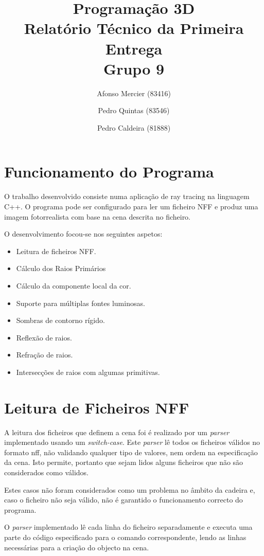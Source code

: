 \documentclass{article}
\title{
    \textbf{Programação 3D} \\
    Relatório Técnico da Primeira Entrega \\
    Grupo 9
}
\author{Afonso Mercier (83416) \and Pedro Quintas (83546) \and Pedro Caldeira (81888)}
\date{}
\begin{document}
    \maketitle

    \begin{multicols}{2}
    \section{Funcionamento do Programa}

    O trabalho desenvolvido consiste numa aplicação de ray tracing na linguagem
    C++. O programa pode ser configurado para ler um ficheiro NFF e produz uma
    imagem fotorrealista com base na cena descrita no ficheiro.

    O desenvolvimento focou-se nos seguintes aspetos:

    \begin{itemize}
        \item Leitura de ficheiros NFF.
        \item Cálculo dos Raios Primários
        \item Cálculo da componente local da cor.
        \item Suporte para múltiplas fontes luminosas.
        \item Sombras de contorno rígido.
        \item Reflexão de raios.
        \item Refração de raios.
        \item Intersecções de raios com algumas primitivas.
    \end{itemize}

    \section{Leitura de Ficheiros NFF}
    
    A leitura dos ficheiros que definem a cena foi é realizado por um \textit{parser} implementado usando um \textit{switch-case}. Este \textit{parser} lê todos os ficheiros válidos no formato nff, não validando qualquer tipo de valores, nem ordem na especificação da cena. Isto permite, portanto que sejam lidos alguns ficheiros que não são considerados como válidos.\par 
    Estes casos não foram considerados como um problema no âmbito da cadeira e, caso o ficheiro não seja válido, não é garantido o funcionamento correcto do programa.\par
    O \textit{parser} implementado lê cada linha do ficheiro separadamente e executa uma parte do código especificado para o comando correspondente, lendo as linhas necessárias para a criação do objecto na cena.
    


\end{multicols}
\end{document}
